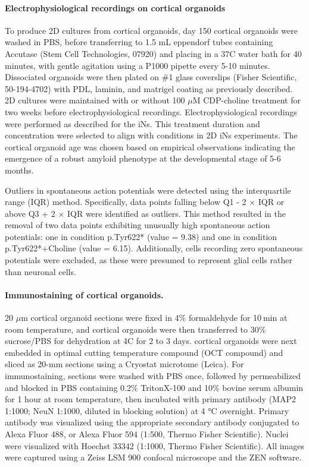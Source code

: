 \paragraph{Electrophysiological recordings on cortical organoids}
To produce 2D cultures from cortical organoids, day 150 cortical organoids were washed in PBS, before transferring to 1.5 mL eppendorf tubes containing Accutase (Stem Cell Technologies, 07920) and placing in a 37C water bath for 40 minutes, with gentle agitation using a P1000 pipette every 5-10 minutes. Dissociated organoids were then plated on \#1 glass coverslips (Fisher Scientific, 50-194-4702) with PDL, laminin, and matrigel coating as previously described. 2D cultures were maintained with or without 100 $\mu$M CDP-choline treatment for two weeks before electrophysiological recordings. Electrophysiological recordings were performed as described for the iNs. This treatment duration and concentration were selected to align with conditions in 2D iNs experiments. The cortical organoid age was chosen based on empirical observations indicating the emergence of a robust amyloid phenotype at the developmental stage of 5-6 months.

Outliers in spontaneous action potentials were detected using the interquartile range (IQR) method. Specifically, data points falling below Q1 - 2 × IQR or above Q3 + 2 × IQR were identified as outliers. This method resulted in the removal of two data points exhibiting unusually high spontaneous action potentials: one in condition p.Tyr622* (value = 9.38) and one in condition p.Tyr622*+Choline (value = 6.15). Additionally, cells recording zero spontaneous potentials were excluded, as these were presumed to represent glial cells rather than neuronal cells.

\paragraph{Immunostaining of cortical organoids.}
20 $\mu$m cortical organoid sections were fixed in 4\% formaldehyde for 10 min at room temperature, and cortical organoids were then transferred to 30\% sucrose/PBS for dehydration at 4C for 2 to 3 days. cortical organoids were next embedded in optimal cutting temperature compound (OCT compound) and sliced as 20-mm sections using a Cryostat microtome (Leica). For immunostaining, sections were washed with PBS once, followed by permeabilized and blocked in PBS containing 0.2\% TritonX-100 and 10\% bovine serum albumin for 1 hour at room temperature, then incubated with primary antibody (MAP2 1:1000; NeuN 1:1000, diluted in blocking solution) at 4 °C overnight. Primary antibody was visualized using the appropriate secondary antibody conjugated to Alexa Fluor 488, or Alexa Fluor 594 (1:500, Thermo Fisher Scientific). Nuclei were visualized with Hoechst 33342 (1:1000, Thermo Fisher Scientific). All images were captured using a Zeiss LSM 900 confocal microscope and the ZEN software. 
